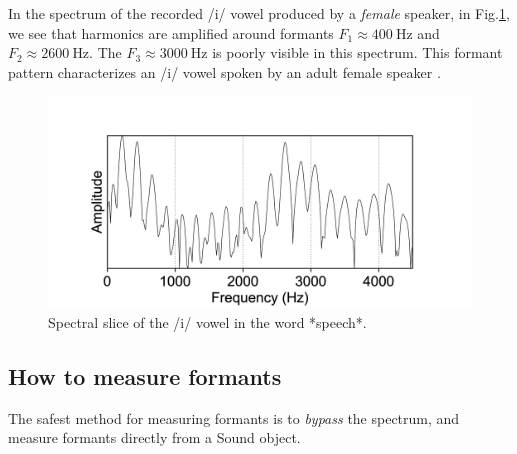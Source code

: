 \documentclass[
]{book}
\begin{document}
In the spectrum of the recorded /i/ vowel produced by a \emph{female} speaker, in Fig.\ref{fig:speech-spectralslice-i}, we see that harmonics are amplified around formants \(F_1 \approx 400\ \textrm{Hz}\) and \(F_2 \approx 2600\ \textrm{Hz}\). The \(F_3 \approx 3000\ \textrm{Hz}\) is poorly visible in this spectrum. This formant pattern characterizes an /i/ vowel spoken by an adult female speaker \citep[Table II]{Peterson_Barney_1952}.

\begin{figure}

{\centering \includegraphics{figures/speech_word_0_210_spectrum} 

}

\caption{Spectral slice of the /i/ vowel in the word *speech*.}\label{fig:speech-spectralslice-i}
\end{figure}

\subsection{How to measure formants}\label{how-to-measure-formants}

\label{box-praatformants}
The safest method for measuring formants is to \emph{bypass} the spectrum, and measure formants directly from a Sound object.
\end{document}
